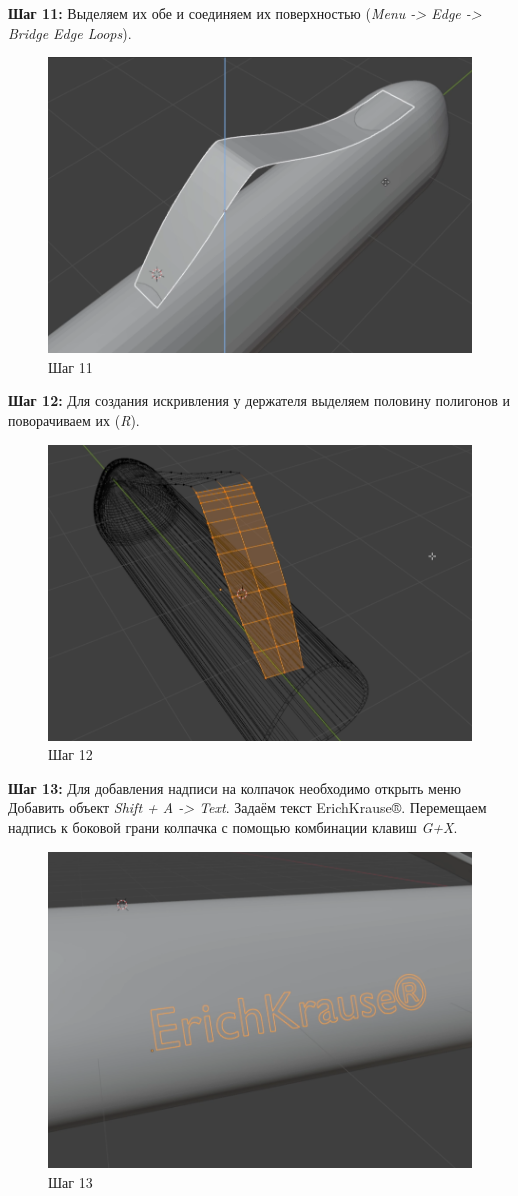 \documentclass[areasetadvanced]{scrartcl}
\begin{document}
\par \textbf{Шаг 11:} Выделяем их обе и соединяем их поверхностью (\textit{Menu -> Edge -> Bridge Edge Loops}).
\begin{figure}[H]
    \label{4} 
    \centering
    \includegraphics[width=0.6\linewidth]{col/11.png}
    \caption{Шаг 11}
\end{figure}


\par \textbf{Шаг 12:} Для создания искривления у держателя выделяем половину полигонов и поворачиваем их (\textit{R}).
\begin{figure}[H]
    \label{4} 
    \centering
    \includegraphics[width=0.6\linewidth]{col/12.png}
    \caption{Шаг 12}
\end{figure}


\par \textbf{Шаг 13:} Для добавления надписи на колпачок необходимо открыть меню Добавить объект \textit{Shift + A -> Text}. Задаём текст \guillemotleft ErichKrause®\guillemotright. Перемещаем надпись к боковой грани колпачка с помощью комбинации клавиш \textit{G+X}.
\begin{figure}[H]
    \label{4} 
    \centering
    \includegraphics[width=0.6\linewidth]{col/13.png}
    \caption{Шаг 13}
\end{figure}
\end{document}
